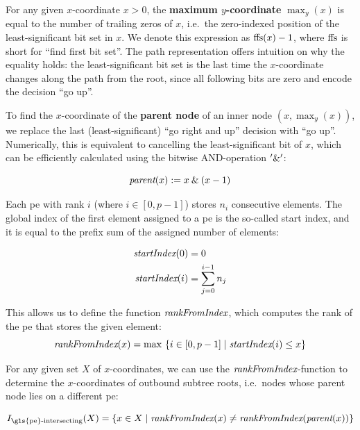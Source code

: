 For any given $x$-coordinate $x > 0$, the \textbf{maximum $y$-coordinate} $\max_y(x)$ is equal to the number of trailing zeros of $x$, i.e.\ the zero-indexed position of the least-significant bit set in $x$.
We denote this expression as $\textrm{ffs} (x) - 1$, where $\textrm{ffs}$ is short for \enquote{find first bit set}.
The path representation offers intuition on why the equality holds: the least-significant bit set is the last time the $x$-coordinate changes along the path from the root, since all following bits are zero and encode the decision \enquote{go up}.

To find the $x$-coordinate of the \textbf{parent node} of an inner node $(x, \max_y(x))$, we replace the last (least-significant) \enquote{go right and up} decision with \enquote{go up}. 
Numerically, this is equivalent to cancelling the least-significant bit of $x$, which can be efficiently calculated using the bitwise AND-operation $'\mathbin{\&}'$:

\begin{equation}
\label{eq:parent}
\textit{parent} (x) := x \mathbin{\&} (x - 1)
\end{equation}

Each \gls{pe} with rank $i$ (where $i \in [0, p - 1]$) stores $n_i$ consecutive elements.
The global index of the first element assigned to a \gls{pe} is the so-called start index, and it is equal to the prefix sum of the assigned number of elements:

\begin{align}
\textit{startIndex} (0) &= 0 \\
\textit{startIndex} (i) &= \sum_{j = 0}^{i - 1} n_j
\label{eq:startIndex}
\end{align}

This allows us to define the function $\textit{rankFromIndex}$, which computes the rank of the \gls{pe} that stores the given element:
\begin{equation}
\textit{rankFromIndex} (x) = \max\ \{i \in [0, p - 1] \;|\; \textit{startIndex} (i) \leq x \}
\end{equation}

For any given set $X$ of $x$-coordinates, we can use the $\textit{rankFromIndex}$-function to determine the $x$-coordinates of outbound subtree roots, i.e.\ nodes whose parent node lies on a different \gls{pe}:

\newcommand{\rankIntersectingIndices}{I_{\textrm{\gls{pe}-intersecting}}}
\begin{equation}
\rankIntersectingIndices (X) = \{x \in X \;|\; \rankFromIndex (x) \neq \rankFromIndex (\parent (x)) \}
\end{equation}

